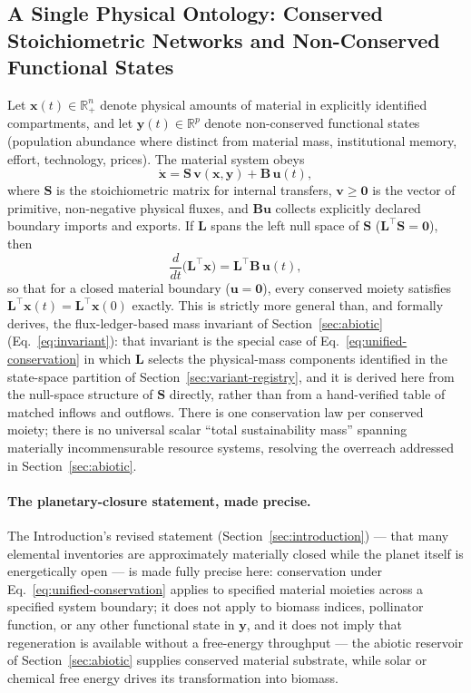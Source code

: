 \documentclass[twocolumn,10pt]{article}
\begin{document}
\subsection{A Single Physical Ontology: Conserved Stoichiometric Networks and Non-Conserved Functional States}
\label{sec:unified-ontology}
Let $\mathbf x(t)\in\mathbb R_+^n$ denote physical amounts of material in explicitly identified compartments, and let $\mathbf y(t)\in\mathbb R^p$ denote non-conserved functional states (population abundance where distinct from material mass, institutional memory, effort, technology, prices). The material system obeys
\begin{equation}
\dot{\mathbf x} = \mathbf S\,\mathbf v(\mathbf x,\mathbf y) + \mathbf B\,\mathbf u(t),
\label{eq:unified-stoich}
\end{equation}
where $\mathbf S$ is the stoichiometric matrix for internal transfers, $\mathbf v\ge\mathbf 0$ is the vector of primitive, non-negative physical fluxes, and $\mathbf B\mathbf u$ collects explicitly declared boundary imports and exports. If $\mathbf L$ spans the left null space of $\mathbf S$ ($\mathbf L^\top\mathbf S=\mathbf 0$), then
\begin{equation}
\frac{d}{dt}\bigl(\mathbf L^\top\mathbf x\bigr) = \mathbf L^\top\mathbf B\,\mathbf u(t),
\label{eq:unified-conservation}
\end{equation}
so that for a closed material boundary ($\mathbf u=\mathbf 0$), every conserved moiety satisfies $\mathbf L^\top\mathbf x(t)=\mathbf L^\top\mathbf x(0)$ exactly. This is strictly more general than, and formally derives, the flux-ledger-based mass invariant of Section~\ref{sec:abiotic} (Eq.~\eqref{eq:invariant}): that invariant is the special case of Eq.~\eqref{eq:unified-conservation} in which $\mathbf L$ selects the physical-mass components identified in the state-space partition of Section~\ref{sec:variant-registry}, and it is derived here from the null-space structure of $\mathbf S$ directly, rather than from a hand-verified table of matched inflows and outflows. There is one conservation law per conserved moiety; there is no universal scalar ``total sustainability mass'' spanning materially incommensurable resource systems, resolving the overreach addressed in Section~\ref{sec:abiotic}.

\paragraph{The planetary-closure statement, made precise.} The Introduction's revised statement (Section~\ref{sec:introduction}) --- that many elemental inventories are approximately materially closed while the planet itself is energetically open --- is made fully precise here: conservation under Eq.~\eqref{eq:unified-conservation} applies to specified material moieties across a specified system boundary; it does not apply to biomass indices, pollinator function, or any other functional state in $\mathbf y$, and it does not imply that regeneration is available without a free-energy throughput --- the abiotic reservoir of Section~\ref{sec:abiotic} supplies conserved material substrate, while solar or chemical free energy drives its transformation into biomass.
\end{document}
